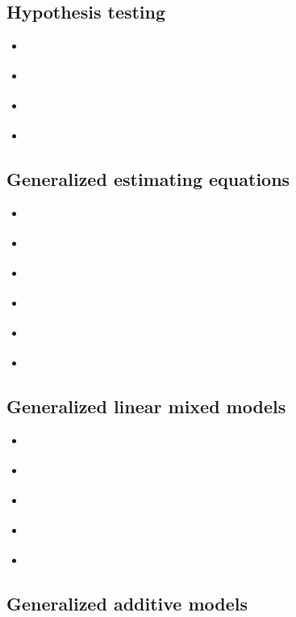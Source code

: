 \documentclass{report}
\begin{document}
\subsection{Hypothesis testing}

\begin{itemize}
    \item \cite[Chapter~8.4]{faraway_extending_2016}
    \item \cite[Chapter~6.5.3]{wakefield_bayesian_2013}
    \item \cite[Chapter~5.7]{dobson_introduction_2018}
    \item \cite[Chapter~4.3]{agresti_foundations_2015}
\end{itemize}

\subsection{Generalized estimating equations}

\begin{itemize}
    \item \cite[Chapter~13.5]{faraway_extending_2016}
    \item \cite[Chapter~8.7]{wakefield_bayesian_2013}
    \item \cite[Chapter~11.4]{dobson_introduction_2018}
    \item \cite[Chapter~9.6]{agresti_foundations_2015}
    \item \cite[Chapter~18.6]{hardin_generalized_2018}
    \item \cite[Chapters~3-4]{hardin_generalized_2012}
\end{itemize}

\subsection{Generalized linear mixed models}

\begin{itemize}
    \item \cite[Chapter~11.5]{dobson_introduction_2018}
    \item \cite[Chapter~13]{faraway_extending_2016}
    \item \cite[Chapter~9]{wakefield_bayesian_2013}
    \item \cite[Chapter~9]{agresti_foundations_2015}
    \item \cite[Chapter~18.4]{hardin_generalized_2018}
\end{itemize}

\subsection{Generalized additive models}
\end{document}
